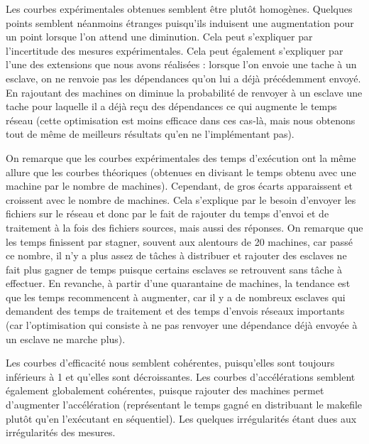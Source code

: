 \documentclass[a4paper, 11pt, titlepage]{article}
\begin{document}
Les courbes expérimentales obtenues semblent être plutôt homogènes. Quelques points semblent néanmoins étranges puisqu'ils induisent une augmentation pour un point lorsque l'on attend une diminution. Cela peut s'expliquer par l'incertitude des mesures expérimentales. Cela peut également s'expliquer par l'une des extensions que nous avons réalisées : lorsque l'on envoie une tache à un esclave, on ne renvoie pas les dépendances qu'on lui a déjà précédemment envoyé. En rajoutant des machines on diminue la probabilité de renvoyer à un esclave une tache pour laquelle il a déjà reçu des dépendances ce qui augmente le temps réseau (cette optimisation est moins efficace dans ces cas-là, mais nous obtenons tout de même de meilleurs résultats qu'en ne l'implémentant pas).

On remarque que les courbes expérimentales des temps d'exécution ont la même allure que les courbes théoriques (obtenues en divisant le temps obtenu avec une machine par le nombre de machines). Cependant, de gros écarts apparaissent et croissent avec le nombre de machines. Cela s'explique par le besoin d'envoyer les fichiers sur le réseau et donc par le fait de rajouter du temps d'envoi et de traitement à la fois des fichiers sources, mais aussi des réponses. On remarque que les temps finissent par stagner, souvent aux alentours de 20 machines, car passé ce nombre, il n'y a plus assez de tâches à distribuer et rajouter des esclaves ne fait plus gagner de temps puisque certains esclaves se retrouvent sans tâche à effectuer. En revanche, à partir d'une quarantaine de machines, la tendance est que les temps recommencent à augmenter, car il y a de nombreux esclaves qui demandent des temps de traitement et des temps d'envois réseaux importants (car l'optimisation qui consiste à ne pas renvoyer une dépendance déjà envoyée à un esclave ne marche plus).

Les courbes d'efficacité nous semblent cohérentes, puisqu'elles sont toujours inférieurs à 1 et qu'elles sont décroissantes. Les courbes d'accélérations semblent également globalement cohérentes, puisque rajouter des machines permet d'augmenter l'accélération (représentant le temps gagné en distribuant le makefile plutôt qu'en l'exécutant en séquentiel). Les quelques irrégularités étant dues aux irrégularités des mesures. 
\end{document}
